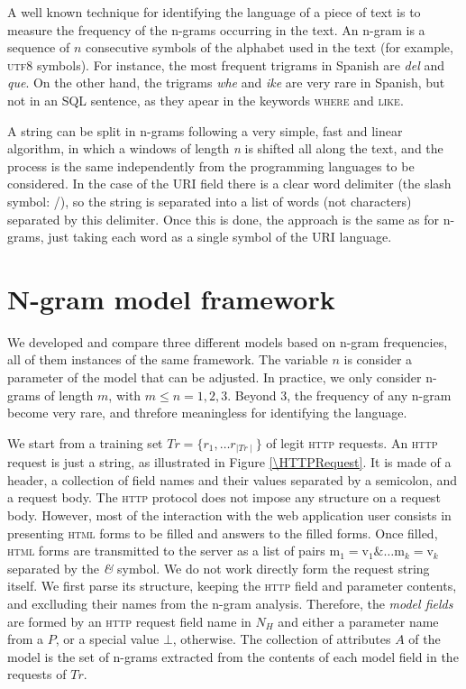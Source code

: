 \documentclass[runningheads,a4paper]{llncs}
\newcommand{\HTTP}{\textsc{http}\xspace}
\newcommand{\HTML}{\textsc{html}\xspace}
\begin{document}
A well known technique for identifying the language of a piece of text is to measure the frequency of the n-grams occurring in the text. An n-gram is a sequence of $n$ consecutive symbols of the alphabet used in the text (for example, \textsc{utf8} symbols). For instance, the most frequent trigrams in Spanish are \textit{del} and \textit{que}. On the other hand, the trigrams \textit{whe} and \textit{ike} are very rare in Spanish, but not in an SQL sentence, as they apear in the keywords \textsc{where} and \textsc{like}. 

A string can be split in n-grams following a very simple, fast and linear algorithm, in which a windows of length \textit{n} is shifted all along the text, and the process is the same independently from the programming languages to be considered. In the case of the URI field there is a clear word delimiter (the slash symbol: /), so the string is separated into a list of words (not characters) separated by this delimiter. Once this is done, the approach is the same as for n-grams, just taking each word as a single symbol of the URI language. 

\section{N-gram model framework}

We developed and compare three different models based on n-gram frequencies, all of them instances of the same framework. The variable $n$ is consider a parameter of the model that can be adjusted. In practice, we only consider n-grams of length $m$, with $m \leq n=1,2,3$. Beyond 3, the frequency of any n-gram become very rare, and threfore meaningless for identifying the language.

We start from a training set $Tr=\{r_1,\ldots r_{\mid Tr \mid}\}$ of legit \HTTP requests. An \HTTP request is just a string, as illustrated in Figure \ref{\HTTPRequest}. It is made of a header, a collection of field names and their values separated by a semicolon, and a request body. The \HTTP protocol does not impose any structure on a request body. However, most of the interaction with the web application user consists in presenting \HTML forms to be filled and answers to the filled forms. Once filled, \HTML forms are transmitted to the server as a list of pairs $\text{m}_1=\text{v}_1 \text{&} \ldots \text{m}_k=\text{v}_k$ separated by the \textit{&} symbol. We do not work directly form the request string itself. We first parse its structure, keeping the \HTTP field and parameter contents, and exclluding their names from the n-gram analysis. Therefore, the \textit{model fields} are formed by an \HTTP request field name in $N_H$ and either a parameter name from a $P$, or a special value $\bot$, otherwise. The collection of attributes $A$ of the model is the set of n-grams extracted from the contents of each model field in the requests of $Tr$.
\end{document}
